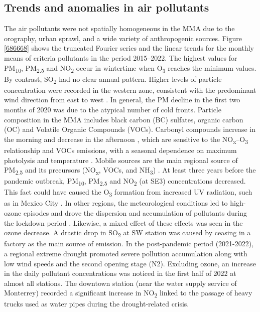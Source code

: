 \documentclass[sn-mathphys-num,iicol]{sn-jnl}
\begin{document}
\subsection{Trends and anomalies in air pollutants}
The air pollutants were not spatially homogeneous in the MMA due to the orography, urban sprawl, and a wide variety of anthropogenic sources. Figure \ref{686668} shows the truncated Fourier series and the linear trends for the monthly means of criteria pollutants in the period 2015–2022. The highest values for PM\textsubscript{10}, PM\textsubscript{2.5} and NO\textsubscript{2} occur in wintertime when O\textsubscript{3} reaches the minimum values. By contrast, SO\textsubscript{2} had no clear annual pattern. Higher levels of particle concentration were recorded in the western zone, consistent with the predominant wind direction from east to west \citep{Gonz_lez_Santiago_2011}. In general, the PM decline in the first two months of 2020 was due to the atypical number of cold fronts. Particle composition in the MMA includes black carbon (BC) \citep{Peralta_2019} sulfates, organic carbon (OC) \citep{Mancilla_2019} and Volatile Organic Compounds (VOCs). Carbonyl compounds increase in the morning and decrease in the afternoon \citep{j2012}, which are sensitive to the NO\textsubscript{x}--O\textsubscript{3} relationship and VOCs emissions, with a seasonal dependence on maximum photolysis and temperature \citep{Menchaca_Torre_2015,Menchaca_Torre_2015a, Hern_ndez_Paniagua_2017}. Mobile sources are the main regional source of PM\textsubscript{2.5} and its precursors (NO\textsubscript{x}, VOCs, and NH\textsubscript{3}) \citep{Martinez-Cinco2016}. At least three years before the pandemic outbreak, PM\textsubscript{10}, PM\textsubscript{2.5} and NO\textsubscript{2} (at SE3) concentrations decreased. This fact could have caused the O\textsubscript{3} formation from increased UV radiation, such as in Mexico City \citep{Ipi_a_2021}. In other regions, the meteorological conditions led to high-ozone episodes and drove the dispersion and accumulation of pollutants during the lockdown period \citep{Tello_Leal_2021,Bera_2022,SULAYMON}. Likewise, a mixed effect of these effects was seen in the ozone decrease. A drastic drop in SO\textsubscript{2} at SW station was caused by ceasing in a factory as the main source of emission. In the post-pandemic period (2021-2022), a regional extreme drought promoted severe pollution accumulation along with low wind speeds and the second opening stage (N2). Excluding ozone, an increase in the daily pollutant concentrations was noticed in the first half of 2022 at almost all stations. The downtown station (near the water supply service of Monterrey) recorded a significant increase in NO\textsubscript{2} linked to the passage of heavy trucks used as water pipes during the drought-related crisis.
\end{document}

